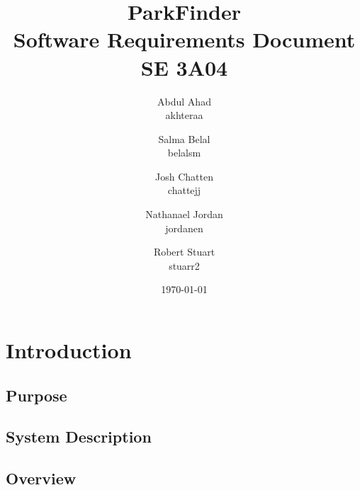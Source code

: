 \documentclass[titlepage]{article}
\title{ParkFinder\\Software Requirements Document\\SE 3A04}
\author{Abdul Ahad \\ akhteraa \and Salma Belal \\ belalsm \and Josh Chatten \\ chattejj \and
Nathanael Jordan \\ jordanen \and Robert Stuart \\ stuarr2}
\date{\today}
\begin{document}
\maketitle	
\thispagestyle{empty}
\clearpage
\setcounter{tocdepth}{2}%
\tableofcontents
\clearpage


\section{Introduction}
\label{sec:introduction}


\subsection{Purpose}
\label{sub:purpose}



\subsection{System Description}
\label{sub:system_description}



\subsection{Overview}
\label{sub:overview}

\end{document}
